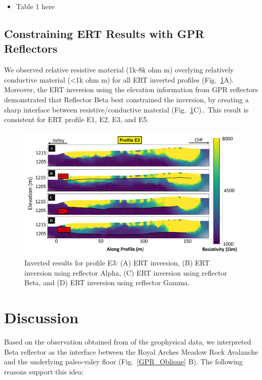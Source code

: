 \documentclass[utf8]{frontiersSCNS}
\begin{document}
\begin{itemize}
    \item Table 1 here
\end{itemize}			   

								   
\subsection{Constraining ERT Results with GPR Reflectors}

We observed relative resistive material (1k-8k ohm m) overlying relatively conductive material (<1k ohm m) for all ERT inverted profiles (Fig.~\ref{ERT_inversion}A). Moreover, the ERT inversion using the elevation information from GPR reflectors demonstrated that Reflector Beta best constrained the inversion, by creating a sharp interface between resistive/conductive material (Fig.~\ref{ERT_inversion}C).. This result is consistent for ERT profile E1, E2, E3, and E5. 

							 \begin{figure}[h]

	\includegraphics[width=\textwidth]{Figures/ERT_inversion.pdf}
		\caption{Inverted results for profile E3: (A) ERT inversion, (B) ERT inversion using reflector Alpha, (C) ERT inversion using reflector Beta, and (D) ERT inversion using reflector Gamma.\label{ERT_inversion}}

								   \end{figure}



\section{Discussion}

Based on the observation obtained from of the geophysical data, we interpreted Beta reflector as the interface between the Royal Arches Meadow Rock Avalanche and the underlying paleo-valey floor (Fig.~\ref{GPR_Oblique} B). The following reasons support this idea: 
\end{document}
